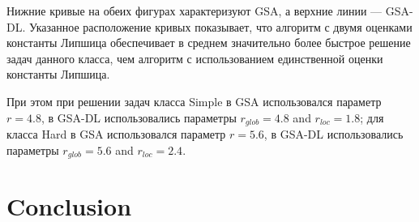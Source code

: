 \documentclass[runningheads]{llncs}
\begin{document}
Нижние кривые на обеих фигурах характеризуют GSA, а верхние линии — GSA-DL. Указанное расположение кривых показывает, что алгоритм с двумя оценками константы Липшица обеспечивает в среднем значительно более быстрое решение задач данного класса, чем алгоритм с использованием единственной оценки константы Липшица.


При этом при решении задач класса Simple в GSA использовался параметр $r=4.8$, в GSA-DL использовались параметры $r_{glob}=4.8$ and $r_{loc}=1.8$; для класса Hard в GSA использовался параметр $r=5.6$, в GSA-DL использовались параметры $r_{glob}=5.6$ and $r_{loc}=2.4$.




\section{Conclusion}


%
%




\end{document}
